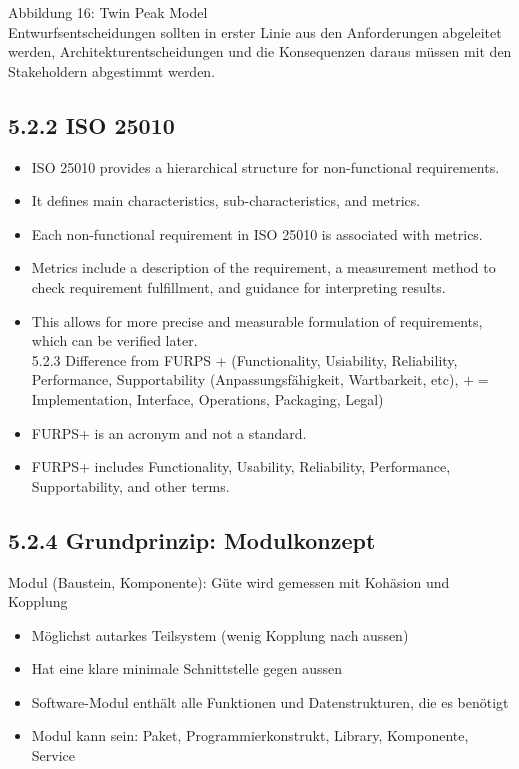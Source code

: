 Abbildung 16: Twin Peak Model\\
Entwurfsentscheidungen sollten in erster Linie aus den Anforderungen abgeleitet werden, Architekturentscheidungen und die Konsequenzen daraus müssen mit den Stakeholdern abgestimmt werden.

\subsection*{5.2.2 ISO 25010}
\begin{itemize}
  \item ISO 25010 provides a hierarchical structure for non-functional requirements.
  \item It defines main characteristics, sub-characteristics, and metrics.
  \item Each non-functional requirement in ISO 25010 is associated with metrics.
  \item Metrics include a description of the requirement, a measurement method to check requirement fulfillment, and guidance for interpreting results.
  \item This allows for more precise and measurable formulation of requirements, which can be verified later.\\
5.2.3 Difference from FURPS + (Functionality, Usiability, Reliability, Performance, Supportability (Anpassungsfähigkeit, Wartbarkeit, etc), $+=$ Implementation, Interface, Operations, Packaging, Legal)
  \item FURPS+ is an acronym and not a standard.
  \item FURPS+ includes Functionality, Usability, Reliability, Performance, Supportability, and other terms.
\end{itemize}

\subsection*{5.2.4 Grundprinzip: Modulkonzept}
Modul (Baustein, Komponente): Güte wird gemessen mit Kohäsion und Kopplung

\begin{itemize}
  \item Möglichst autarkes Teilsystem (wenig Kopplung nach aussen)
  \item Hat eine klare minimale Schnittstelle gegen aussen
  \item Software-Modul enthält alle Funktionen und Datenstrukturen, die es benötigt
  \item Modul kann sein: Paket, Programmierkonstrukt, Library, Komponente, Service
\end{itemize}


